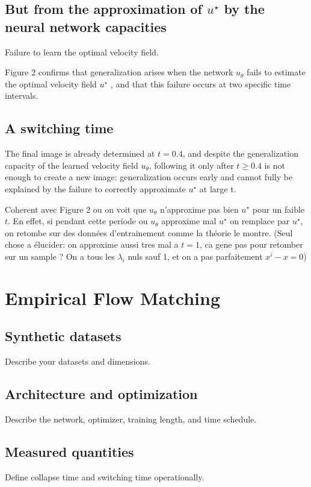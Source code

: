 \documentclass[10pt,a4paper]{article}
\theoremstyle{definition}
\begin{document}
\subsection{But from the approximation of $u^{\star}$ by the neural network capacities}

Failure to learn the optimal velocity field.


Figure 2 confirms that generalization arises when the network $u_{\theta}$ fails to estimate the optimal velocity
field $u^\star$ , and that this failure occurs at two specific time intervals.

\subsection{A switching time}


The final image is already determined at $t= 0.4$, and despite the generalization capacity of the learned
velocity field $u_{\theta}$, following it only after $t \geq0.4$ is not enough to create a new image: generalization
occurs early and cannot fully be explained by the failure to correctly approximate $u^\star$ at large t.

Coherent avec Figure 2 ou on voit que $u_{\theta}$ n'approxime pas bien $u^\star$ pour un faible $t$. En effet, si pendant cette periode ou $u_{\theta}$ approxime mal $u^\star$  on remplace par $u^\star$, on retombe sur des données d'entrainement comme la théorie le montre. (Seul chose a élucider: on approxime aussi tres mal a $t=1$, ca gene pas pour retomber sur un sample ? On a tous les $\lambda _i$ nuls sauf 1, et on a pas parfaitement $x^{i} - x = 0$)


\section{Empirical Flow Matching}
\subsection{Synthetic datasets}
Describe your datasets and dimensions.

\subsection{Architecture and optimization}
Describe the network, optimizer, training length, and time schedule.

\subsection{Measured quantities}
Define collapse time and switching time operationally.
\end{document}
